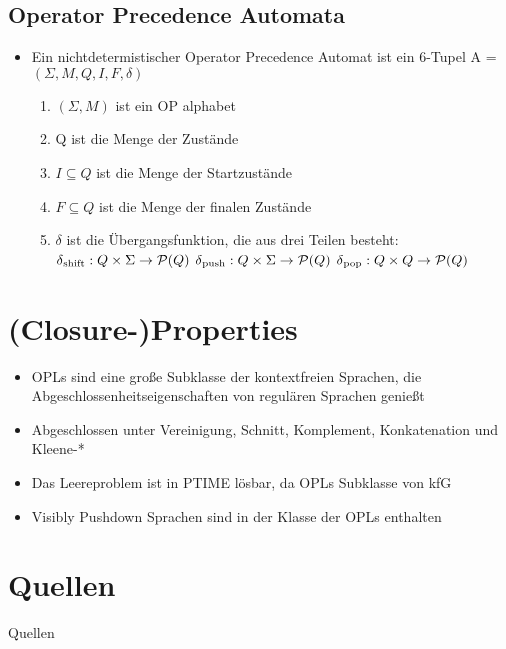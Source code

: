 \documentclass[
10pt,
pantone315, 	%
]{beamer}
\begin{document}
\subsection{Operator Precedence Automata}
\begin{frame}[t]{\secname}
	\begin{itemize}[<+->]
		\item
		Ein nichtdetermistischer Operator Precedence Automat ist ein 6-Tupel A = $(\Sigma, M, Q, I, F, \delta)$
		\begin{enumerate}
			\item
			$(\Sigma, M)$ ist ein OP alphabet
			\item
			Q ist die Menge der Zustände
			\item
			$ I \subseteq Q$ ist die Menge der Startzustände
			\item
			$ F \subseteq Q$ ist die Menge der finalen Zustände
			\item 
			$\delta$ ist die Übergangsfunktion, die aus drei Teilen besteht: \\
			$\delta \textsubscript{shift}: Q \times \Sigma \rightarrow \mathcal{P} (Q)$
			$\delta \textsubscript{push}: Q \times \Sigma \rightarrow \mathcal{P} (Q)$
			$\delta \textsubscript{pop}: Q \times Q \rightarrow \mathcal{P} (Q)$
		\end{enumerate}
			
	\end{itemize}
\end{frame}

\section{(Closure-)Properties}
\begin{frame}[t]{\secname}
	\begin{itemize}[<+->]
	\item 
	OPLs sind eine große Subklasse der kontextfreien Sprachen, die Abgeschlossenheitseigenschaften von regulären Sprachen genießt
	\item
	Abgeschlossen unter Vereinigung, Schnitt, Komplement, Konkatenation und Kleene-*
	\item
	Das Leereproblem ist in PTIME lösbar, da OPLs Subklasse von kfG
	\item Visibly Pushdown Sprachen sind in der Klasse der OPLs enthalten
	\end{itemize}
\end{frame}

\nocite{*}
\section*{Quellen}
\begin{frame}{Quellen}
	\printbibliography
\end{frame}
\end{document}
